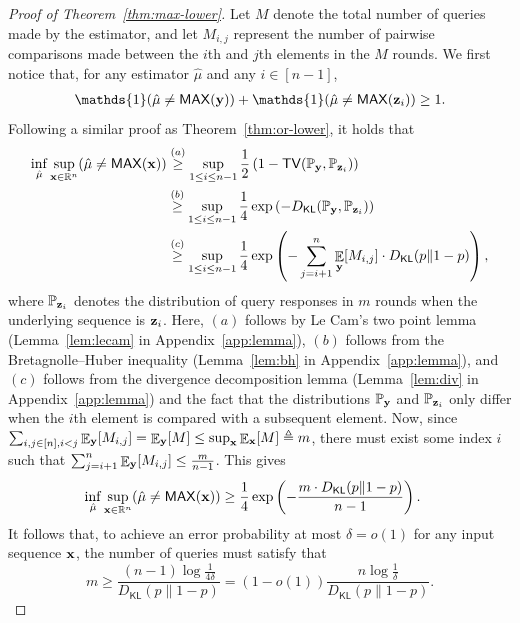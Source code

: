 \documentclass[journal, onecolumn]{IEEEtran}
\theoremstyle{plain}
\theoremstyle{definition}
\theoremstyle{remark}
\DeclareMathOperator\E{\mathbb{E}}
\let\P\relax
\DeclareMathOperator\P{\mathsf{P}}
\def\DKL{{D_\mathsf{KL}(p\|1-p)}}
\begin{document}
\begin{proof}[Proof of Theorem~\ref{thm:max-lower}]
    Let $M$ denote the total number of queries made by the estimator, and let $M_{i,j}$ represent the number of pairwise comparisons made between the $i$th and $j$th elements in the $M$ rounds. We first notice that, for any estimator $\hat\mu$ and any $i \in [n-1]$,
    \begin{align*}
        \mathds{1}(\hat\mu \neq \maxn({\bf y})) +  \mathds{1}(\hat\mu \neq \maxn({\bf z}_i)) \geq 1.
    \end{align*}
    Following a similar proof as Theorem~\ref{thm:or-lower}, it holds that
    \begin{align*}
          \inf_{\hat\mu} \sup_{{\bf x}\in \mathbb{R}^n} \P(\hat\mu \neq \mathsf{MAX}({\bf x}))
          & \stackrel{(a)}{\geq} \sup_{1\leq i\leq n-1}\frac{1}{2}\left(1-\mathsf{TV}(\mathbb{P}_{{\bf y}}, \mathbb{P}_{{\bf z}_i})\right)  \\ 
          & \stackrel{(b)}{\geq} \sup_{1\leq i\leq n-1} \frac{1}{4}\exp\left(-D_{\mathsf{KL}}(\mathbb{P}_{{\bf y}}, \mathbb{P}_{{\bf z}_i})\right) \\
          & \stackrel{(c)}{\geq} \sup_{1\leq i\leq n-1} \frac{1}{4}\exp\left(-\sum_{j=i+1}^n \E_{{\bf y}}[M_{i,j}] \cdot D_{\mathsf{KL}}(p\|1-p)\right),
    \end{align*}
    where $\mathbb{P}_{{\bf z}_i}$ denotes the distribution of query responses in $m$ rounds when the underlying sequence is ${\bf z}_i$. Here, $(a)$ follows by Le Cam's two point lemma (Lemma~\ref{lem:lecam} in Appendix~\ref{app:lemma}), $(b)$ follows from the Bretagnolle–Huber inequality (Lemma~\ref{lem:bh} in Appendix~\ref{app:lemma}), and $(c)$ follows from the divergence decomposition lemma (Lemma~\ref{lem:div} in Appendix~\ref{app:lemma}) and the fact that the distributions $\mathbb{P}_{{\bf y}}$ and $\mathbb{P}_{{\bf z}_i}$ only differ when the $i$th element is compared with a subsequent element. Now, since $\sum_{i,j\in[n], i< j} \E_{{\bf y}}[M_{i,j}] = \E_{{\bf y}}[M] \leq \sup_{\bf x}\E_{\bf x}[M] \triangleq m$, there must exist some index $i$ such that $\sum_{j=i+1}^n \E_{{\bf y}}[M_{i,j}]  \leq \frac{m}{n-1}$. This gives
    \begin{align*}
          \inf_{\hat\mu} \sup_{{\bf x}\in\mathbb{R}^n} \P(\hat\mu \neq \maxn({\bf x})) &  \geq  \frac{1}{4}\exp\left(-\frac{m\cdot \DKL}{n-1}\right).
    \end{align*}
    It follows that, to achieve an error probability at most $\delta=o(1)$ for any input sequence ${\bf x}$, the number of queries must satisfy that
    \[
        m\geq \frac{(n-1)\log \frac{1}{4\delta}}{\DKL}=(1-o(1))\frac{n\log \frac{1}{\delta}}{\DKL}.
    \]
\end{proof}
\end{document}
